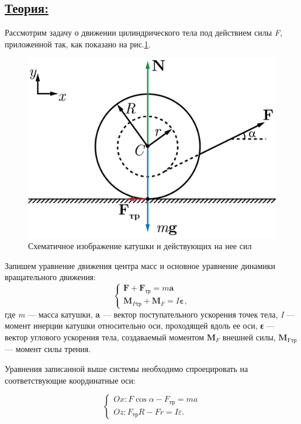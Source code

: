 \documentclass[14pt,a4paper,oneside]{extarticle}	%
\begin{document}
\newpage
\subsection*{\underline{Теория:}}
Рассмотрим задачу о движении цилиндрического тела под действием силы \textit{F}, приложенной так, как показано на рис.\ref{roll-3}.

\begin{figure}[H] 
	\centering 		
	\includegraphics[width=0.6\linewidth]{roll-3.png} 
	\caption{Схематичное изображение катушки и действующих на нее сил}
	\label{roll-3}
\end{figure}

Запишем уравнение движения центра масс и основное уравнение динамики вращательного движения:
\begin{equation}\label{roll-eq1}
\begin{cases}
\textbf{F} + \textbf{F}_{\text{тр}} = m\textbf{a} \\
\textbf{M}_{F\text{тр}} + \textbf{M}_F= I\textbf{ε},
\end{cases}
\end{equation}
где \textit{m} — масса катушки, \textbf{a} — вектор поступательного ускорения точек тела, \textit{I} — момент инерции катушки относительно оси, проходящей вдоль ее оси, \textbf{ε} — вектор углового ускорения тела, создаваемый моментом $ \textbf{M}_F $ внешней силы, $ \textbf{M}_{\text{Fтр}} $ — момент силы трения.

Уравнения записанной выше системы необходимо спроецировать на соответствующие координатные оси:

\begin{equation}\label{roll-eq2}
\begin{cases}
Ox: F\cos\alpha - F_{\text{тр}} = ma \\
Oz: F_{\text{тр}}R - Fr= I \varepsilon.
\end{cases}
\end{equation}
\end{document}
